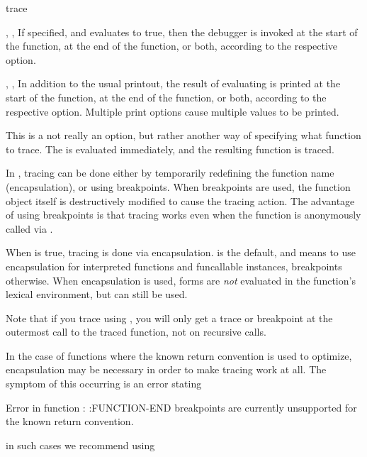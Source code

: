 \begin{defmac}{}{trace}{%
    }
\begin{Lentry}
  \item[\kwd{break} \var{form}, \kwd{break-after} \var{form},
    \kwd{break-all} \var{form}] If specified, and  evaluates
    to true, then the debugger is invoked at the start of the
    function, at the end of the function, or both, according to the
    respective option.
    
  \item[\kwd{print} \var{form}, \kwd{print-after} \var{form},
    \kwd{print-all} \var{form}] In addition to the usual printout, the
    result of evaluating  is printed at the start of the
    function, at the end of the function, or both, according to the
    respective option.  Multiple print options cause multiple values
    to be printed.
    
  \item[\kwd{function} \var{function-form}] This is a not really an
    option, but rather another way of specifying what function to
    trace.  The  is evaluated immediately, and the
    resulting function is traced.
    
  \item[\kwd{encapsulate \mgroup{:default | t | nil}}] In \cmucl,
    tracing can be done either by temporarily redefining the function
    name (encapsulation), or using breakpoints.  When breakpoints are
    used, the function object itself is destructively modified to
    cause the tracing action.  The advantage of using breakpoints is
    that tracing works even when the function is anonymously called
    via .
  
    When  is true, tracing is done via encapsulation.
     is the default, and means to use encapsulation for
    interpreted functions and funcallable instances, breakpoints
    otherwise.  When encapsulation is used, forms are {\it not}
    evaluated in the function's lexical environment, but
     can still be used.

    Note that if you trace using , you will
    only get a trace or breakpoint at the outermost call to the traced
    function, not on recursive calls.

  \end{Lentry}

  In the case of functions where the known return convention is used
  to optimize, encapsulation may be necessary in order to make
  tracing work at all.  The symptom of this occurring is an error
  stating
  \begin{example}
    Error in function : :FUNCTION-END breakpoints are
    currently unsupported for the known return convention.
  \end{example}
  in such cases we recommend using 
  

\end{defmac}
